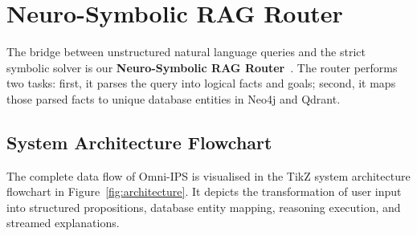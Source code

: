 \section{Neuro-Symbolic RAG Router}
\label{sec:rag_router}

The bridge between unstructured natural language queries and the strict symbolic solver is our \textbf{Neuro-Symbolic RAG Router}~\cite{edge2024graphrag}. The router performs two tasks: first, it parses the query into logical facts and goals; second, it maps those parsed facts to unique database entities in Neo4j and Qdrant.

\subsection{System Architecture Flowchart}
The complete data flow of Omni-IPS is visualised in the TikZ system architecture flowchart in Figure~\ref{fig:architecture}. It depicts the transformation of user input into structured propositions, database entity mapping, reasoning execution, and streamed explanations.

